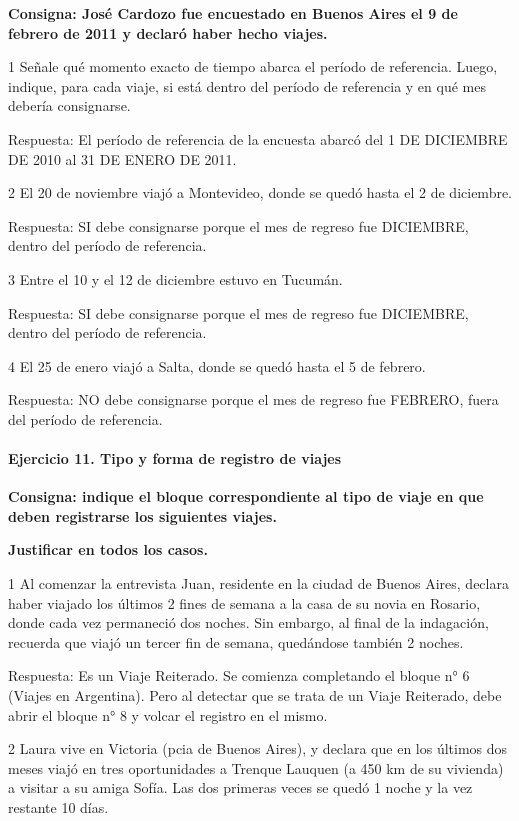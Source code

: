 \documentclass[
  openany]{book}
\begin{document}
\textbf{Consigna: José Cardozo fue encuestado en Buenos Aires el 9 de febrero de 2011 y declaró haber hecho viajes.}

1 Señale qué momento exacto de tiempo abarca el período de referencia. Luego, indique, para cada viaje, si está dentro del período de referencia y en qué mes debería consignarse.

Respuesta: El período de referencia de la encuesta abarcó del 1 DE DICIEMBRE DE 2010 al 31 DE ENERO DE 2011.

2 El 20 de noviembre viajó a Montevideo, donde se quedó hasta el 2 de diciembre.

Respuesta: SI debe consignarse porque el mes de regreso fue DICIEMBRE, dentro del período de referencia.

3 Entre el 10 y el 12 de diciembre estuvo en Tucumán.

Respuesta: SI debe consignarse porque el mes de regreso fue DICIEMBRE, dentro del período de referencia.

4 El 25 de enero viajó a Salta, donde se quedó hasta el 5 de febrero.

Respuesta: NO debe consignarse porque el mes de regreso fue FEBRERO, fuera del período de referencia.

\hypertarget{ejercicio-11.-tipo-y-forma-de-registro-de-viajes-1}{%
\paragraph{Ejercicio 11. Tipo y forma de registro de viajes}\label{ejercicio-11.-tipo-y-forma-de-registro-de-viajes-1}}

\textbf{Consigna: indique el bloque correspondiente al tipo de viaje en que deben registrarse los siguientes viajes.}

\textbf{Justificar en todos los casos.}

1 Al comenzar la entrevista Juan, residente en la ciudad de Buenos Aires, declara haber viajado los últimos 2 fines de semana a la casa de su novia en Rosario, donde cada vez permaneció dos noches. Sin embargo, al final de la indagación, recuerda que viajó un tercer fin de semana, quedándose también 2 noches.

Respuesta: Es un Viaje Reiterado. Se comienza completando el bloque n° 6 (Viajes en Argentina). Pero al detectar que se trata de un Viaje Reiterado, debe abrir el bloque n° 8 y volcar el registro en el mismo.

2 Laura vive en Victoria (pcia de Buenos Aires), y declara que en los últimos dos meses viajó en tres oportunidades a Trenque Lauquen (a 450 km de su vivienda) a visitar a su amiga Sofía. Las dos primeras veces se quedó 1 noche y la vez restante 10 días.
\end{document}
